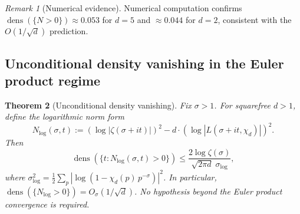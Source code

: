 \documentclass[12pt,reqno]{amsart}
\theoremstyle{plain}
\newtheorem{theorem}{Theorem}[section]
\theoremstyle{definition}
\theoremstyle{remark}
\newtheorem{remark}[theorem]{Remark}
\DeclareMathOperator{\dens}{dens}
\begin{document}
\begin{remark}[Numerical evidence]
Numerical computation confirms $\dens(\{N > 0\}) \approx 0.053$ for $d = 5$ and $\approx 0.044$ for $d = 2$, consistent with the $O(1/\sqrt{d})$ prediction.
\end{remark}

\subsection{Unconditional density vanishing in the Euler product regime}

\begin{theorem}[Unconditional density vanishing]\label{thm:euler-density}
Fix $\sigma > 1$. For squarefree $d > 1$, define the logarithmic norm form
\[
N_{\log}(\sigma, t) := (\log|\zeta(\sigma + it)|)^2 - d \cdot (\log|L(\sigma + it, \chi_d)|)^2.
\]
Then
\[
\dens(\{t : N_{\log}(\sigma, t) > 0\}) \leq \frac{2\log\zeta(\sigma)}{\sqrt{2\pi d}\;\sigma_{\log}},
\]
where $\sigma_{\log}^2 = \frac{1}{2}\sum_p |\log(1 - \chi_d(p)\,p^{-\sigma})|^2$. In particular, $\dens(\{N_{\log} > 0\}) = O_\sigma(1/\sqrt{d})$. No hypothesis beyond the Euler product convergence is required.
\end{theorem}
\end{document}
